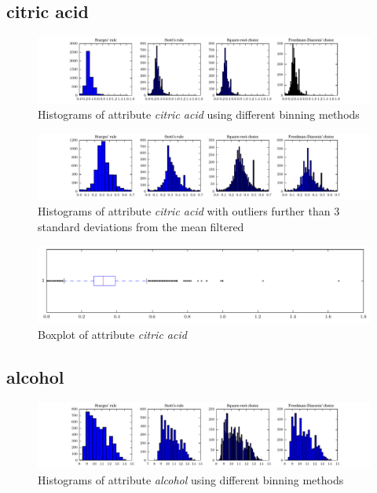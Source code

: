 \documentclass{report}
\begin{document}
\newpage\subsection{citric acid}
\begin{figure}[H]
\includegraphics[width=\textwidth]{histograms/citric_acid.pdf}
\caption{Histograms of attribute \emph{citric acid} using different binning methods}\end{figure}

\begin{figure}[H]
\includegraphics[width=\textwidth]{histograms/citric_acid_filtered.pdf}
\caption{Histograms of attribute \emph{citric acid} with outliers further than 3 standard deviations from the mean filtered}
\end{figure}

\begin{figure}[H]
\includegraphics[width=\textwidth]{boxplots/citric_acid.pdf}
\caption{Boxplot of attribute \emph{citric acid}}\end{figure}

\newpage\subsection{alcohol}
\begin{figure}[H]
\includegraphics[width=\textwidth]{histograms/alcohol.pdf}
\caption{Histograms of attribute \emph{alcohol} using different binning methods}\end{figure}
\end{document}
